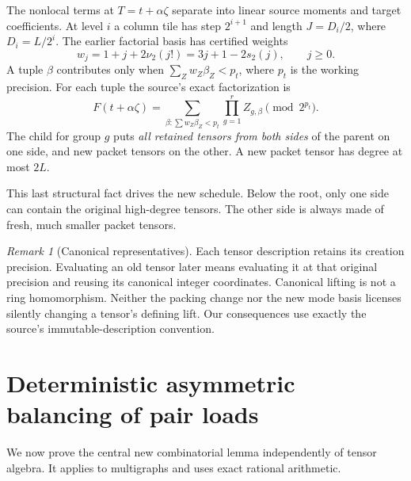 \documentclass[11pt,letterpaper]{article}
\theoremstyle{remark}\newtheorem{remark}[theorem]{Remark}
\begin{document}
The nonlocal terms at $T=t+\alpha\zeta$ separate into linear source
moments and target coefficients. At level $i$ a column tile has step
$2^{i+1}$ and length $J=D_i/2$, where $D_i=L/2^i$. The earlier factorial
basis has certified weights
\begin{equation}\label{eq:factorial-weights}
 w_j=1+j+2\nu_2(j!)=3j+1-2s_2(j),\qquad j\ge0.
\end{equation}
A tuple $\beta$ contributes only when $\sum_Zw_Z\beta_Z<p_t$, where
$p_t$ is the working precision. For each tuple the source's exact
factorization is
\begin{equation}\label{eq:recursion-interface}
 F(t+\alpha\zeta)=\sum_{\beta:\sum w_Z\beta_Z<p_t}
                  \prod_{g=1}^r Z_{g,\beta}\pmod{2^{p_t}}.
\end{equation}
The child for group $g$ puts \emph{all retained tensors from both sides}
of the parent on one side, and new packet tensors on the other.
A new packet tensor has degree at most $2L$.

This last structural fact drives the new schedule. Below the root, only
one side can contain the original high-degree tensors. The other side is
always made of fresh, much smaller packet tensors.

\begin{remark}[Canonical representatives]
Each tensor description retains its creation precision. Evaluating an
old tensor later means evaluating it at that original precision and
reusing its canonical integer coordinates. Canonical lifting is not a
ring homomorphism. Neither the packing change nor the new mode basis
licenses silently changing a tensor's defining lift. Our consequences
use exactly the source's immutable-description convention.
\end{remark}

\section{Deterministic asymmetric balancing of pair loads}
\label{sec:packing}
We now prove the central new combinatorial lemma independently of tensor
algebra. It applies to multigraphs and uses exact rational arithmetic.
\end{document}
